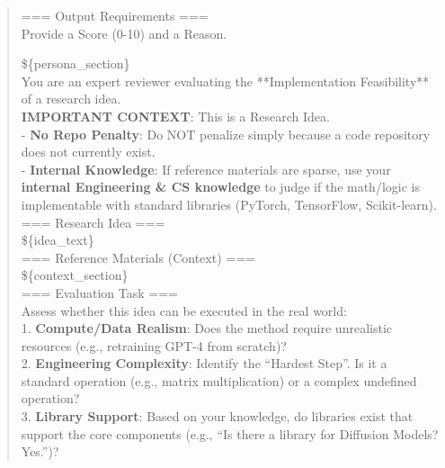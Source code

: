 \begin{quote}
\begin{tcolorbox}[breakable,colback=eval!20!white, colframe=eval!60!black, title=\textbf{Prompt for Evaluation Agent - Novelty}]
        === Output Requirements ===\\
        Provide a Score (0-10) and a Reason.
    \end{tcolorbox}

    \begin{tcolorbox}[breakable,colback=eval!20!white, colframe=eval!60!black, title=\textbf{Prompt for Evaluation Agent - Feasibility}]
    \label{app:prompt_eval_feasibility}
        \$\{persona\_section\}\\
        You are an expert reviewer evaluating the **Implementation Feasibility** of a research idea.\\

        \textbf{IMPORTANT CONTEXT}: This is a Research Idea.\\
        - \textbf{No Repo Penalty}: Do NOT penalize simply because a code repository does not currently exist.\\
        - \textbf{Internal Knowledge}: If reference materials are sparse, use your \textbf{internal Engineering \& CS knowledge} to judge if the math/logic is implementable with standard libraries (PyTorch, TensorFlow, Scikit-learn).\\

        === Research Idea ===\\
        \$\{idea\_text\}\\

        === Reference Materials (Context) ===\\
        \$\{context\_section\}\\

        === Evaluation Task ===\\
        Assess whether this idea can be executed in the real world:\\

        1.  \textbf{Compute/Data Realism}: Does the method require unrealistic resources (e.g., retraining GPT-4 from scratch)?\\
        2.  \textbf{Engineering Complexity}: Identify the ``Hardest Step''. Is it a standard operation (e.g., matrix multiplication) or a complex undefined operation?\\
        3.  \textbf{Library Support}: Based on your knowledge, do libraries exist that support the core components (e.g., ``Is there a library for Diffusion Models? Yes.'')?\\


\end{tcolorbox}
\end{quote}
